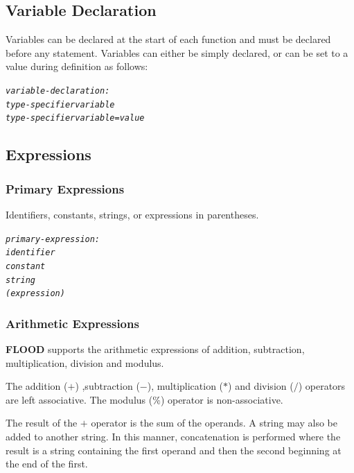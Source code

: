 \documentclass[12pt]{report}
\begin{document}
\subsection{Variable Declaration}

Variables can be declared at the start of each function and must be declared before any statement. Variables can either be simply declared, or can be set to a value during definition as follows:

\begin{alltt}\begin{singlespace}
         \textit{variable-declaration:}
              \textit{type-specifier variable}
              \textit{type-specifier variable = value}\end{singlespace}
\end{alltt}

\subsection{Expressions}

\subsubsection{Primary Expressions}

Identifiers, constants, strings, or expressions in parentheses.

\begin{alltt}\begin{singlespace}
         \textit{primary-expression:}
            \textit{identifier}
            \textit{constant}
            \textit{string}
            \textit{( expression )}\end{singlespace}
\end{alltt}

\subsubsection{Arithmetic Expressions}

\textbf{FLOOD} supports the arithmetic expressions of addition, subtraction, multiplication, division and modulus.

The addition ($+$) ,subtraction ($-$), multiplication ($*$) and division ($/$) operators are left associative. The modulus ($\%$) operator is non-associative.

The result of the $+$ operator is the sum of the operands. A string may also be added to another string. In this manner, concatenation is performed where the result is a string containing the first operand and then the second beginning at the end of the first.
\end{document}
